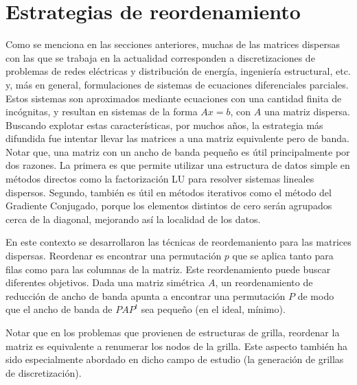 \section{Estrategias de reordenamiento}\label{sec:reordenamientos}


Como se menciona en las secciones anteriores, muchas de las matrices dispersas con las que se trabaja en la actualidad corresponden a discretizaciones de problemas de redes eléctricas y distribución de energía, ingeniería estructural, etc. y, más en general, formulaciones de sistemas de ecuaciones diferenciales parciales. Estos sistemas son aproximados mediante ecuaciones con una cantidad finita de incógnitas, y resultan en sistemas de la forma $Ax = b$, con $A$ una matriz dispersa.
Buscando explotar estas características, por muchos años, la estrategia más difundida fue intentar llevar las matrices a una matriz equivalente pero de banda. Notar que, una matriz con un ancho de banda pequeño es útil principalmente por dos razones. La primera es que permite utilizar una estructura de datos simple en métodos directos como la factorización LU para resolver sistemas lineales dispersos. Segundo, también es útil en métodos iterativos como el método del Gradiente Conjugado, porque los elementos distintos de cero serán agrupados cerca de la diagonal, mejorando así la localidad de los datos. 


En este contexto se desarrollaron las técnicas de reordemaniento para las matrices dispersas. Reordenar es encontrar una permutación $p$ que se aplica tanto para filas como para las columnas de la matriz. Este reordenamiento puede buscar diferentes objetivos. Dada una matriz simétrica $A$, un reordenamiento de reducción de ancho de banda apunta a encontrar una permutación $P$ de modo que el ancho de banda de $PAP^t$ sea pequeño (en el ideal, mínimo). 

Notar que en los problemas que provienen de estructuras de grilla, reordenar la matriz es equivalente a renumerar los nodos de la grilla. Este aspecto también ha sido especialmente abordado en dicho campo de estudio (la generación de grillas de discretización).



